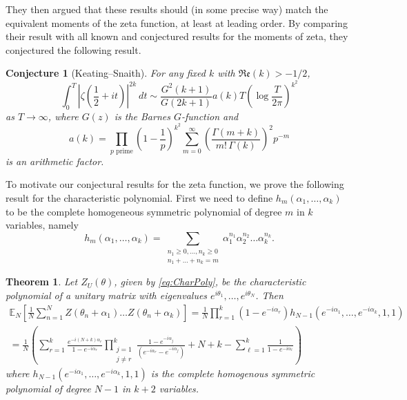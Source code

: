 \documentclass[12pt,a4paper,reqno]{amsart}
\newtheorem{theorem}{Theorem}
\newtheorem{conjecture}{Conjecture}
\theoremstyle{remark}
\numberwithin{equation}{section}
\renewcommand{\Re}{\mathfrak{Re}}
\newcommand{\E}{\mathbb{E}}
\begin{document}
They then argued that these results should (in some precise way) match the equivalent moments of the zeta function, at least at leading order. By comparing their result with all known and conjectured results for the moments of zeta, they conjectured the following result.
\begin{conjecture}[Keating--Snaith]
For any fixed $k$ with $\Re (k) > -1/2$,
\begin{equation*}
     \int_{0}^{T} \left|\zeta \left(\frac{1}{2} + it \right) \right|^{2k} \ dt \sim  \frac{G^2 (k+1)}{G(2k+1)} a(k) T \left( \log \frac{T}{2\pi} \right)^{k^2}
\end{equation*}
as $T \rightarrow \infty$, where $G(z)$ is the Barnes $G$-function and
\begin{equation}\label{AF}
    a(k) = \prod_{p \text{ prime}} \left( 1 - \frac{1}{p} \right)^{k^2} \sum_{m=0}^{\infty} \left( \frac{\Gamma (m+k)}{m! \, \Gamma (k)} \right)^2 p^{-m}
\end{equation}
is an arithmetic factor.
\end{conjecture}

To motivate our conjectural results for the zeta function, we prove the following result for the characteristic polynomial. First we need to define $h_m(\alpha_1,\dots,\alpha_k)$ to be the complete homogeneous symmetric polynomial of degree $m$ in $k$ variables, namely
\begin{equation}\label{eq:homoSympoly}
h_m(\alpha_1,\dots,\alpha_k) = \sum_{\substack{n_1 \geq 0,\dots,n_k \geq 0 \\ n_1 + \dots + n_k = m}} \alpha_1^{n_1} \alpha_2^{n_2} \dots \alpha_k^{n_{k}}.
\end{equation}

\begin{theorem}\label{thm:CharPoly}
Let $Z_U(\theta)$, given by \eqref{eq:CharPoly}, be the characteristic polynomial of a unitary matrix with eigenvalues $e^{i\theta_1},\dots,e^{i\theta_N}$. Then
\begin{multline*}
\E_N\left[\frac{1}{N} \sum_{n=1}^N Z(\theta_n+\alpha_1) \dots Z(\theta_n+\alpha_k)\right] = \frac{1}{N}\prod_{r=1}^k \left(1-e^{-i\alpha_r}\right) h_{N-1}\left(e^{-i\alpha_1} , \dots, e^{-i\alpha_k} , 1,1 \right)\\
= \frac{1}{N} \left(\sum_{r=1}^{k} \frac{e^{-i(N+k)\alpha_r} }{1-e^{-i\alpha_r}} \prod_{\substack{j=1 \\ j \neq r}}^{k} \frac{1-e^{-i\alpha_j}}{(e^{-i\alpha_r} - e^{-i\alpha_j})} + N+k - \sum_{\ell=1}^k \frac{1}{1-e^{-i\alpha_\ell}} \right)
\end{multline*}
where $h_{N-1}\left(e^{-i\alpha_1} , \dots, e^{-i\alpha_k} , 1,1 \right)$ is the complete homogenous symmetric polynomial of degree $N-1$ in $k+2$ variables.
\end{theorem}
\end{document}
